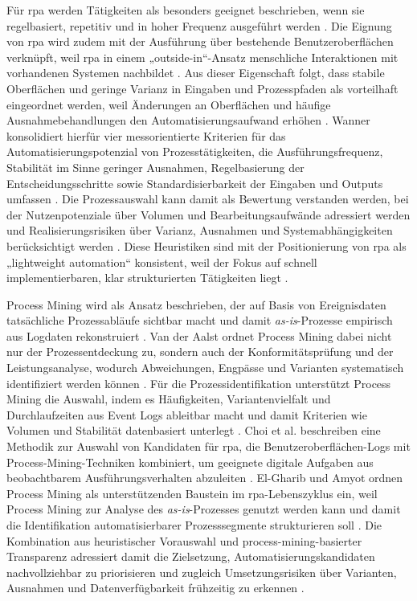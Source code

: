 Für \gls{rpa} werden Tätigkeiten als besonders geeignet beschrieben, wenn sie regelbasiert, repetitiv und in hoher Frequenz ausgeführt werden \cite{AalstBichlerHeinzl2018RPA}. 
Die Eignung von \gls{rpa} wird zudem mit der Ausführung über bestehende Benutzeroberflächen verknüpft, weil \gls{rpa} in einem „outside-in“-Ansatz menschliche Interaktionen mit vorhandenen Systemen nachbildet \cite{AalstBichlerHeinzl2018RPA}. 
Aus dieser Eigenschaft folgt, dass stabile Oberflächen und geringe Varianz in Eingaben und Prozesspfaden als vorteilhaft eingeordnet werden, weil Änderungen an Oberflächen und häufige Ausnahmebehandlungen den Automatisierungsaufwand erhöhen \cite{Wanner2022ProcessSelectionRPA}. 
Wanner konsolidiert hierfür vier messorientierte Kriterien für das Automatisierungspotenzial von Prozesstätigkeiten, die Ausführungsfrequenz, Stabilität im Sinne geringer Ausnahmen, Regelbasierung der Entscheidungsschritte sowie Standardisierbarkeit der Eingaben und Outputs umfassen \cite{Wanner2022ProcessSelectionRPA}. 
Die Prozessauswahl kann damit als Bewertung verstanden werden, bei der Nutzenpotenziale über Volumen und Bearbeitungsaufwände adressiert werden und Realisierungsrisiken über Varianz, Ausnahmen und Systemabhängigkeiten berücksichtigt werden \cite{Wanner2022ProcessSelectionRPA}. 
Diese Heuristiken sind mit der Positionierung von \gls{rpa} als „lightweight automation“ konsistent, weil der Fokus auf schnell implementierbaren, klar strukturierten Tätigkeiten liegt \cite{AalstBichlerHeinzl2018RPA}. 

Process Mining wird als Ansatz beschrieben, der auf Basis von Ereignisdaten tatsächliche Prozessabläufe sichtbar macht und damit \emph{as-is}-Prozesse empirisch aus Logdaten rekonstruiert \cite{Aalst2016ProcessMining}. 
Van der Aalst ordnet Process Mining dabei nicht nur der Prozessentdeckung zu, sondern auch der Konformitätsprüfung und der Leistungsanalyse, wodurch Abweichungen, Engpässe und Varianten systematisch identifiziert werden können \cite{Aalst2016ProcessMining}. 
Für die Prozessidentifikation unterstützt Process Mining die Auswahl, indem es Häufigkeiten, Variantenvielfalt und Durchlaufzeiten aus Event Logs ableitbar macht und damit Kriterien wie Volumen und Stabilität datenbasiert unterlegt \cite{Aalst2016ProcessMining}. 
Choi et al. beschreiben eine Methodik zur Auswahl von Kandidaten für \gls{rpa}, die Benutzeroberflächen-Logs mit Process-Mining-Techniken kombiniert, um geeignete digitale Aufgaben aus beobachtbarem Ausführungsverhalten abzuleiten \cite{Choi2021CandidateTasksRPA}. 
El-Gharib und Amyot ordnen Process Mining als unterstützenden Baustein im \gls{rpa}-Lebenszyklus ein, weil Process Mining zur Analyse des \emph{as-is}-Prozesses genutzt werden kann und damit die Identifikation automatisierbarer Prozesssegmente strukturieren soll \cite{ElGharibAmyot2023SLR}. 
Die Kombination aus heuristischer Vorauswahl und process-mining-basierter Transparenz adressiert damit die Zielsetzung, Automatisierungskandidaten nachvollziehbar zu priorisieren und zugleich Umsetzungsrisiken über Varianten, Ausnahmen und Datenverfügbarkeit frühzeitig zu erkennen \cite{Wanner2022ProcessSelectionRPA,Aalst2016ProcessMining}. 



